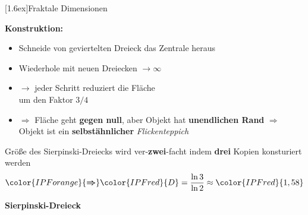 \documentclass[final]{beamer}
\newlength{\columnheight}
\newlength{\marginw}
\newlength{\tw}
\newlength{\colw}
\newenvironment{myTwoColPoster}{%
  \begin{minipage}[t]{\textwidth}%
    \hspace*{\marginw}%
    \hspace*{9.5bp}%
    \begin{minipage}[t]{\tw}}%
  {\end{minipage}%
   \hspace*{\marginw}%
   \end{minipage}}
\newenvironment{myCol}%
    {\begin{minipage}[t][\columnheight][t]{\colw}}%
    {\end{minipage}}
\newenvironment{textblock}[1]%
    {\begin{block}{\rule[-0.6ex]{0pt}{2.4ex}\raisebox{-0.25ex}[1.6ex]{#1}}%
     \vspace*{5mm}}%
    {\vspace*{5mm}\end{block}}
\begin{document}
\begin{frame}[t]{}
\begin{myTwoColPoster}
\begin{myCol}
\begin{textblock}{Fraktale Dimensionen}
  \begin{minipage}[c]{0.58\textwidth}
    \vspace*{1.0cm}
    \textbf{ Konstruktion:}
    \begin{itemize} \setlength\itemsep{1.1em} \Large
      \item Schneide von geviertelten Dreieck das Zentrale heraus
      \item Wiederhole mit neuen Dreiecken $\to\infty$
      \item \textcolor{IPForange}{$\rightarrow$} jeder Schritt reduziert die Fläche\\
      um den Faktor $3/4$
      \item \textcolor{IPForange}{$\Rightarrow$} Fläche geht \textbf{gegen null}, aber Objekt hat \textbf{unendlichen Rand}
      \textcolor{IPForange}{\textbf{$\Rightarrow$}} Objekt ist ein \textcolor{IPForange}{\textbf{ selbst\"ahnlicher}}\textit{ Flickenteppich}\\[1.2em]
    \end{itemize}
      Gr\"o\ss e des Sierpinski-Dreiecks wird ver-\textcolor{IPForange}{\textbf{zwei}}-facht indem \textcolor{IPForange}{\textbf{drei}} Kopien konsturiert werden
      \begin{align*}
        {\color{IPForange}{\boldsymbol{\Rightarrow}}} {\color{IPFred}{ D }} =\frac{\ln 3}{\ln 2}\approx  \color{IPFred}{1,58}
      \end{align*}
    \end{minipage}
    \begin{minipage}[c]{0.35\textwidth}
      \begin{center}\vspace*{-5cm}
        \textbf{ Sierpinski-Dreieck}\\[1cm]

\end{center}
\end{minipage}
\end{textblock}
\end{myCol}
\end{myTwoColPoster}
\end{frame}
\end{document}
